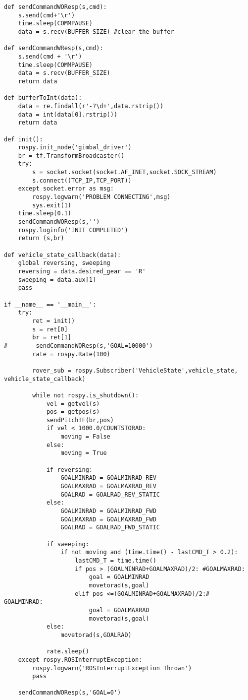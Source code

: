 \begin{verbatim}
def sendCommandWOResp(s,cmd):
    s.send(cmd+'\r')
    time.sleep(COMMPAUSE)
    data = s.recv(BUFFER_SIZE) #clear the buffer

def sendCommandWResp(s,cmd):
    s.send(cmd + '\r')
    time.sleep(COMMPAUSE)
    data = s.recv(BUFFER_SIZE)
    return data

def bufferToInt(data):
    data = re.findall(r'-?\d+',data.rstrip())
    data = int(data[0].rstrip())
    return data 

def init():
    rospy.init_node('gimbal_driver')
    br = tf.TransformBroadcaster()
    try:
        s = socket.socket(socket.AF_INET,socket.SOCK_STREAM)
        s.connect((TCP_IP,TCP_PORT))
    except socket.error as msg:
        rospy.logwarn('PROBLEM CONNECTING',msg)
        sys.exit(1)
    time.sleep(0.1)
    sendCommandWOResp(s,'')
    rospy.loginfo('INIT COMPLETED')
    return (s,br)

def vehicle_state_callback(data):
    global reversing, sweeping
    reversing = data.desired_gear == 'R' 
    sweeping = data.aux[1]
    pass

if __name__ == '__main__':
    try:
        ret = init()
        s = ret[0]
        br = ret[1]
#        sendCommandWOResp(s,'GOAL=10000')
        rate = rospy.Rate(100)

        rover_sub = rospy.Subscriber('VehicleState',vehicle_state, vehicle_state_callback)

        while not rospy.is_shutdown():
            vel = getvel(s)
            pos = getpos(s)
            sendPitchTF(br,pos)
            if vel < 1000.0/COUNTSTORAD:
                moving = False
            else:
                moving = True

            if reversing:
                GOALMINRAD = GOALMINRAD_REV
                GOALMAXRAD = GOALMAXRAD_REV
                GOALRAD = GOALRAD_REV_STATIC
            else:
                GOALMINRAD = GOALMINRAD_FWD
                GOALMAXRAD = GOALMAXRAD_FWD
                GOALRAD = GOALRAD_FWD_STATIC

            if sweeping:
                if not moving and (time.time() - lastCMD_T > 0.2):
                    lastCMD_T = time.time()
                    if pos > (GOALMINRAD+GOALMAXRAD)/2: #GOALMAXRAD:
                        goal = GOALMINRAD
                        movetorad(s,goal)
                    elif pos <=(GOALMINRAD+GOALMAXRAD)/2:#  GOALMINRAD:
                        goal = GOALMAXRAD
                        movetorad(s,goal)
            else:
                movetorad(s,GOALRAD)

            rate.sleep()
    except rospy.ROSInterruptException:
        rospy.logwarn('ROSInterruptException Thrown')
        pass

    sendCommandWOResp(s,'GOAL=0')
\end{verbatim}


